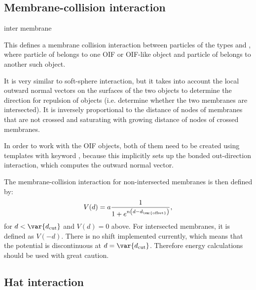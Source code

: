 \subsection{Membrane-collision interaction}

\begin{essyntax}
  inter  
  membrane    
  \begin{features}
  \end{features}
\end{essyntax}
This defines a membrane collision interaction between particles of the types
 and , where particle of  belongs to one OIF or OIF-like 
object and particle of  belongs to another such object. 

It is very similar 
to soft-sphere interaction, but it takes into account the local outward 
normal vectors on the surfaces of the two objects to determine 
the direction for repulsion of objects (i.e. determine whether the two membranes are intersected). 
It is inversely proportional to the distance 
of nodes of membranes that are not crossed and saturating with growing distance 
of nodes of crossed membranes. 

In order to work with the OIF objects, both of them need to 
be created using templates with keyword , because this implicitly 
sets up the bonded out-direction interaction, which computes the outward normal vector. 

The membrane-collision interaction 
for non-intersected membranes is then defined by:
\begin{equation}
  V(d)= a\frac{1}{1+e^{n\left(d-d_\mathrm{\var{offset}}\right)}},
\end{equation}
for $d<\var{d_\mathrm{cut}}$ and $V(d)=0$ above. 
For intersected membranes, it is defined as $V(-d)$.
There is no shift implemented currently, which means that the potential is discontinuous
at $d=\var{d_\mathrm{cut}}$. Therefore energy calculations should be
used with great caution.


\subsection{Hat interaction}

